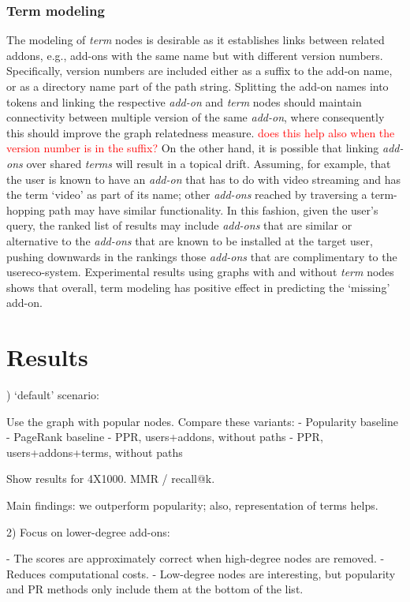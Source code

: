 \documentclass[11pt,oneside]{book}
\let\Oldsection\section
\renewcommand{\section}{\FloatBarrier\Oldsection}
\let\Oldsubsubsection\subsubsection
\renewcommand{\subsubsection}{\FloatBarrier\Oldsubsubsection}
\begin{document}
\subsubsection{Term modeling}

The modeling of {\it term} nodes is desirable as it establishes links between related addons, e.g., add-ons with the same name but with different version numbers. Specifically, version numbers are included either as a suffix to the add-on name, or as a directory name part of the path string. Splitting the add-on names into tokens and linking the respective {\it add-on} and {\it term} nodes should maintain connectivity between multiple version of the same {\it add-on}, where consequently this should improve the graph relatedness measure. \textcolor{red}{does this help also when the version number is in the suffix?} On the other hand, it is possible that linking {\it add-ons} over shared {\it terms} will result in a topical drift. Assuming, for example, that the user is known to have an {\it add-on} that has to do with video streaming and has the term `video' as part of its name; other {\it add-ons} reached by traversing a term-hopping path may have similar functionality. In this fashion, given the user's query, the ranked list of results may include {\it add-ons} that are similar or alternative to the {\it add-ons} that are known to be installed at the target user, pushing downwards in the rankings those {\it add-ons} that are complimentary to the user\s eco-system. Experimental results using graphs with and without {\it term} nodes shows that overall, term modeling has positive effect in predicting the `missing' add-on.

\section{Results}

) `default' scenario:

Use the graph with popular nodes. Compare these variants:
- Popularity baseline
- PageRank baseline
- PPR, users+addons, without paths
- PPR, users+addons+terms, without paths

Show results for 4X1000. MMR / recall@k.

Main findings: we outperform popularity; also, representation of terms helps.

2) Focus on lower-degree add-ons:

- The scores are approximately correct when high-degree nodes are removed.
- Reduces computational costs.
- Low-degree nodes are interesting, but popularity and PR methods only include them at the bottom of the list.
\end{document}
